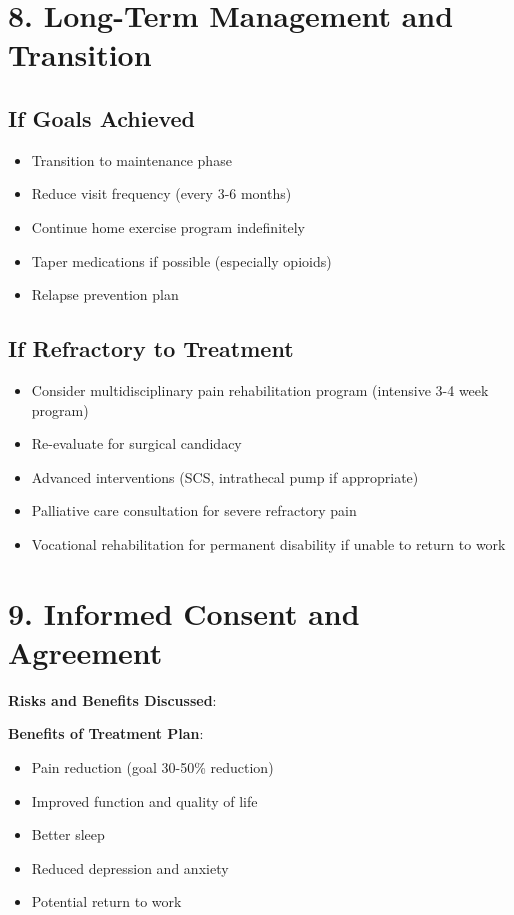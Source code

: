\documentclass[11pt,letterpaper]{article}
\begin{document}
\section*{8. Long-Term Management and Transition}

\subsection*{If Goals Achieved}

\begin{itemize}[leftmargin=*]
    \item Transition to maintenance phase
    \item Reduce visit frequency (every 3-6 months)
    \item Continue home exercise program indefinitely
    \item Taper medications if possible (especially opioids)
    \item Relapse prevention plan
\end{itemize}

\subsection*{If Refractory to Treatment}

\begin{itemize}[leftmargin=*]
    \item Consider multidisciplinary pain rehabilitation program (intensive 3-4 week program)
    \item Re-evaluate for surgical candidacy
    \item Advanced interventions (SCS, intrathecal pump if appropriate)
    \item Palliative care consultation for severe refractory pain
    \item Vocational rehabilitation for permanent disability if unable to return to work
\end{itemize}

\section*{9. Informed Consent and Agreement}

\textbf{Risks and Benefits Discussed}:

\textbf{Benefits of Treatment Plan}:
\begin{itemize}[leftmargin=*]
    \item Pain reduction (goal 30-50\% reduction)
    \item Improved function and quality of life
    \item Better sleep
    \item Reduced depression and anxiety
    \item Potential return to work
\end{itemize}
\end{document}
